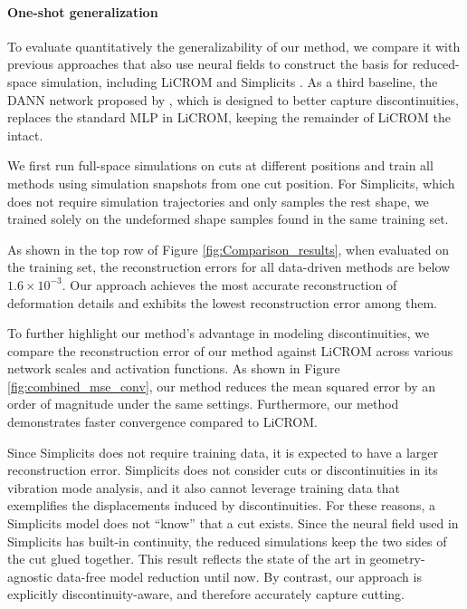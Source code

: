 \paragraph{One-shot generalization}
To evaluate quantitatively the generalizability of our method, we compare it with previous approaches that also use neural fields to construct the basis for reduced-space simulation, including LiCROM \cite{chang:2023:licrom} and Simplicits \cite{Modi:2024:Simplicits}. As a third baseline, the DANN network proposed by \citet{Belhe:2023:DiscontinuityAwareNeuralFields}, which is designed to better capture discontinuities, replaces the standard MLP in LiCROM, keeping the remainder of LiCROM the intact.

We first run full-space simulations on cuts at different positions and train all methods using simulation snapshots from one cut position. For Simplicits, which does not require simulation trajectories and only samples the rest shape, we trained solely on the undeformed shape samples found in the same training set.

As shown in the top row of Figure \ref{fig:Comparison_results}, when evaluated on the training set, the reconstruction errors for all data-driven methods are below $1.6 \times 10^{-3}$. Our approach achieves the most accurate reconstruction of deformation details and exhibits the lowest reconstruction error among them. 

To further highlight our method's advantage in modeling discontinuities, we compare the reconstruction error of our method against LiCROM \cite{chang:2023:licrom} across various network scales and activation functions. As shown in Figure \ref{fig:combined_mse_conv}, our method reduces the mean squared error by an order of magnitude under the same settings. Furthermore, our method demonstrates faster convergence compared to LiCROM.

Since Simplicits \citet{Modi:2024:Simplicits} does not require training data, it is expected to have a larger reconstruction error. Simplicits does not consider cuts or discontinuities in its vibration mode analysis, and it also cannot leverage training data that exemplifies the displacements induced by discontinuities. For these reasons, a Simplicits model does not ``know'' that a cut exists. Since the neural field used in Simplicits has built-in continuity, the reduced simulations keep the two sides of the cut glued together. This result reflects the state of the art in geometry-agnostic data-free model reduction until now. By contrast, our approach is explicitly discontinuity-aware, and therefore accurately capture cutting. 


